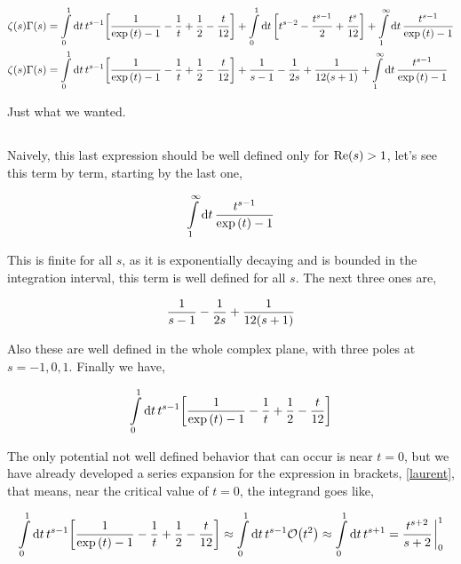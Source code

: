\begin{align*}
    \zeta(s)\Gamma\qty(s)&=\int\limits_0^1\dd{t}t^{s-1}\qty[\frac{1}{\exp\qty(t)-1}-\frac1t+\frac12-\frac{t}{12}]+\int\limits_0^1\dd{t}\qty[t^{s-2}-\frac{t^{s-1}}{2}+\frac{t^s}{12}]+\int\limits_1^\infty\dd{t}\frac{t^{s-1}}{\exp\qty(t)-1}\\
    \zeta(s)\Gamma\qty(s)&=\int\limits_0^1\dd{t}t^{s-1}\qty[\frac{1}{\exp\qty(t)-1}-\frac1t+\frac12-\frac{t}{12}]+\frac{1}{s-1}-\frac{1}{2s}+\frac{1}{12\qty(s+1)}+\int\limits_1^\infty\dd{t}\frac{t^{s-1}}{\exp\qty(t)-1}   
\end{align*}

Just what we wanted.

\subsection{}

Naively, this last expression should be well defined only for $\textnormal{Re}\qty(s)>1$, let's see this term by term, starting by the last one,

\begin{align*}
    \int\limits_1^\infty\dd{t}\frac{t^{s-1}}{\exp\qty(t)-1}
\end{align*}

This is finite for all $s$, as it is exponentially decaying and is bounded in the integration interval, this term is well defined for all $s$. 
The next three ones are,

\begin{align*}
    \frac{1}{s-1}-\frac{1}{2s}+\frac{1}{12\qty(s+1)}
\end{align*}

Also these are well defined in the whole complex plane, with three poles at $s=-1,0,1$. Finally we have,

\begin{align*}
    \int\limits_0^1\dd{t}t^{s-1}\qty[\frac{1}{\exp\qty(t)-1}-\frac1t+\frac12-\frac{t}{12}]
\end{align*}

The only potential not well defined behavior that can occur is near $t=0$, but we have already developed a 
series expansion for the expression in brackets, \ref{laurent}, that means, near the critical value of $t=0$, 
the integrand goes like,

\begin{align*}
    \int\limits_0^1\dd{t}t^{s-1}\qty[\frac{1}{\exp\qty(t)-1}-\frac1t+\frac12-\frac{t}{12}]\approx\int\limits_0^1\dd{t}t^{s-1}\mathcal O\qty(t^2)\approx \int\limits_0^1\dd{t}t^{s+1}=\frac{t^{s+2}}{s+2}\eval_0^1
\end{align*}


